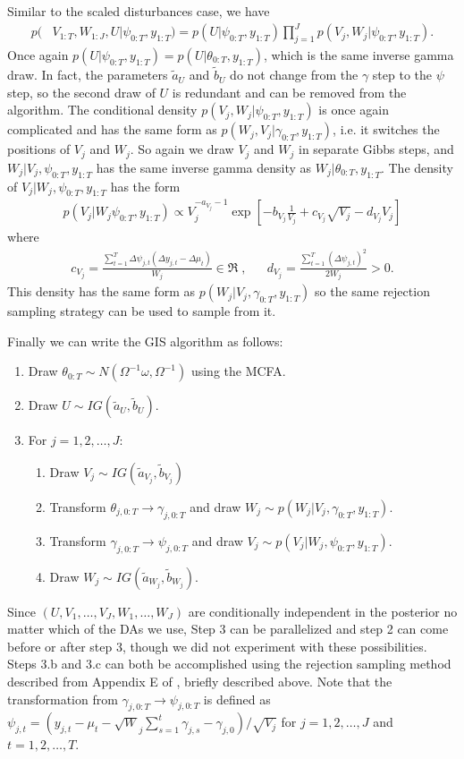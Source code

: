 \documentclass[graybox]{svmult}
\begin{document}
Similar to the scaled disturbances case, we have
\begin{align*}
p(&V_{1:T},W_{1:J},U|\psi_{0:T},y_{1:T})=p(U|\psi_{0:T},y_{1:T})\prod_{j=1}^Jp(V_j,W_j|\psi_{0:T},y_{1:T}).
\end{align*}
Once again $p(U|\psi_{0:T},y_{1:T})=p(U|\theta_{0:T},y_{1:T})$, which is the same inverse gamma draw. In fact, the parameters $\tilde{a}_{U}$ and $\tilde{b}_U$ do not change from the $\gamma$ step to the $\psi$ step, so the second draw of $U$ is redundant and can be removed from the algorithm. The conditional density $p(V_j,W_j|\psi_{0:T},y_{1:T})$ is once again complicated and has the same form as $p(W_j,V_j|\gamma_{0:T},y_{1:T})$, i.e. it switches the positions of $V_j$ and $W_j$. So again we draw $V_j$ and $W_j$ in separate Gibbs steps, and $W_j|V_j,\psi_{0:T},y_{1:T}$ has the same inverse gamma density as $W_j|\theta_{0:T},y_{1:T}$. The density of $V_j|W_j,\psi_{0:T},y_{1:T}$ has the form
\begin{align*}
p(V_j|W_j\psi_{0:T},y_{1:T}) \propto V_j^{-a_{V_j}-1}\exp\left[-b_{V_j}\frac{1}{V_j} + c_{V_j}\sqrt{V_j} - d_{V_j}V_j\right]
\end{align*}
where
\begin{align*}
c_{V_j}=\frac{\sum_{t=1}^T\Delta\psi_{j,t}(\Delta y_{j,t} - \Delta \mu_t)}{W_j}\in\Re\;,&&d_{V_j} = \frac{\sum_{t=1}^T(\Delta \psi_{j,t})^2}{2W_j} >0.
\end{align*}
This density has the same form as $p(W_j|V_j,\gamma_{0:T},y_{1:T})$ so the same rejection sampling strategy can be used to sample from it.

Finally we can write the GIS algorithm as follows:
\begin{enumerate}
\item Draw $\theta_{0:T}\sim N(\Omega^{-1}\omega, \Omega^{-1})$ using the MCFA.
\item Draw $U\sim IG(\tilde{a}_U,\tilde{b}_U)$. 
\item For $j=1,2,\dots,J$:
\begin{enumerate}
\item Draw $V_j \sim IG(\tilde{a}_{V_j}, \tilde{b}_{V_j})$
\item Transform $\theta_{j,0:T}\to \gamma_{j,0:T}$ and draw $W_j\sim p(W_j|V_j,\gamma_{0:T},y_{1:T})$.
\item Transform $\gamma_{j,0:T}\to \psi_{j,0:T}$ and draw $V_j\sim p(V_j|W_j,\psi_{0:T},y_{1:T})$.
\item Draw $W_j \sim IG(\tilde{a}_{W_j}, \tilde{b}_{W_j})$.
\end{enumerate}
\end{enumerate}
Since $(U,V_1,\dots,V_J,W_1,\dots,W_J)$ are conditionally independent in the posterior no matter which of the DAs we use, Step 3 can be parallelized and step 2 can come before or after step 3, though we did not experiment with these possibilities. Steps 3.b and 3.c can both be accomplished using the rejection sampling method described from Appendix E of \cite{simpson2014interweaving}, briefly described above. Note that the transformation from $\gamma_{j,0:T}\to \psi_{j,0:T}$ is defined as $\psi_{j,t} = (y_{j,t} - \mu_t - \sqrt{W}_j\sum_{s=1}^t\gamma_{j,s} - \gamma_{j,0})/\sqrt{V_j}$ for $j=1,2,\dots,J$ and $t=1,2,\dots,T$.
\end{document}
